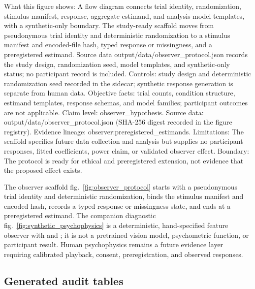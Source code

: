 \documentclass[
  english,
]{article}
\newcounter{none} %
\begin{document}
What this figure shows: A flow diagram connects trial identity,
randomization, stimulus manifest, response, aggregate estimand, and
analysis-model templates, with a synthetic-only boundary. The
study-ready scaffold moves from pseudonymous trial identity and
deterministic randomization to a stimulus manifest and encoded-file
hash, typed response or missingness, and a preregistered estimand.
Source data output/data/observer\_protocol.json records the study
design, randomization seed, model templates, and synthetic-only status;
no participant record is included. Controls: study design and
deterministic randomization seed recorded in the sidecar; synthetic
response generation is separate from human data. Objective facts: trial
counts, condition structure, estimand templates, response schemas, and
model families; participant outcomes are not applicable. Claim level:
observer\_hypothesis. Source data: output/data/observer\_protocol.json
(SHA-256 digest recorded in the figure registry). Evidence lineage:
observer:preregistered\_estimands. Limitations: The scaffold specifies
future data collection and analysis but supplies no participant
responses, fitted coefficients, power claim, or validated observer
effect. Boundary: The protocol is ready for ethical and preregistered
extension, not evidence that the proposed effect exists.

The observer scaffold fig.~\ref{fig:observer_protocol} starts with a
pseudonymous trial identity and deterministic randomization, binds the
stimulus manifest and encoded hash, records a typed response or
missingness state, and ends at a preregistered estimand. The companion
diagnostic fig.~\ref{fig:synthetic_psychophysics} is a deterministic,
hand-specified feature observer with  and
; it is not a pretrained vision model,
psychometric function, or participant result. Human psychophysics
remains a future evidence layer requiring calibrated playback, consent,
preregistration, and observed responses.

\subsection{Generated audit tables}\label{generated-audit-tables}
\end{document}
